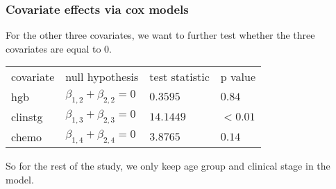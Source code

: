 \documentclass{beamer}[10]
\begin{document}
\begin{frame}
	\frametitle{Covariate effects via cox models}
	For the other three covariates, we want to further test whether the three covariates are equal to $0$.
	\begin{center}
	\begin{tabular}{llll}
		\hline
		covariate&null hypothesis&test statistic& p value\\
		hgb&$\beta_{1, 2} + \beta_{2, 2} = 0$&$0.3595$&$0.84$\\
		clinstg&$\beta_{1, 3} + \beta_{2, 3} = 0$&$14.1449$&$<0.01$\\
		chemo&$\beta_{1, 4} + \beta_{2, 4} = 0$&$3.8765$&$0.14$\\
		\hline
	\end{tabular}
\end{center}
So for the rest of the study, we only keep age group and clinical stage in the model.
\end{frame}
\end{document}
